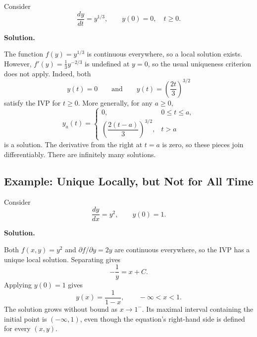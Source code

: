 \documentclass[11pt]{article}
\newenvironment{solution}
    {\par\noindent\textbf{Solution.}\par}
    {\par}
\begin{document}
Consider
\[
\frac{dy}{dt}=y^{1/3}, \qquad y(0)=0, \quad t\geq0.
\]

\begin{solution}
The function \(f(y)=y^{1/3}\) is continuous everywhere, so a local
solution exists. However, \(f'(y)=\frac13y^{-2/3}\) is undefined at
\(y=0\), so the usual uniqueness criterion does not apply.
Indeed, both
\[
y(t)=0
\qquad\text{and}\qquad
y(t)=\left(\frac{2t}{3}\right)^{3/2}
\]
satisfy the IVP for \(t\geq0\). More generally, for any \(a\geq0\),
\[
y_a(t)=
\begin{cases}
0, & 0\leq t\leq a,\\
\left(\dfrac{2(t-a)}{3}\right)^{3/2}, & t>a
\end{cases}
\]
is a solution. The derivative from the right at \(t=a\) is zero, so
these pieces join differentiably. There are infinitely many solutions.
\end{solution}

\subsection{Example: Unique Locally, but Not for All Time}

Consider
\[
\frac{dy}{dx}=y^2, \qquad y(0)=1.
\]

\begin{solution}
Both \(f(x,y)=y^2\) and \(\partial f/\partial y=2y\) are continuous
everywhere, so the IVP has a unique local solution. Separating gives
\[
-\frac{1}{y}=x+C.
\]
Applying \(y(0)=1\) gives
\[
\boxed{y(x)=\frac{1}{1-x},\qquad -\infty<x<1.}
\]
The solution grows without bound as \(x\to1^-\). Its maximal
interval containing the initial point is \((-\infty,1)\), even though
the equation's right-hand side is defined for every \((x,y)\).
\end{solution}
\end{document}
